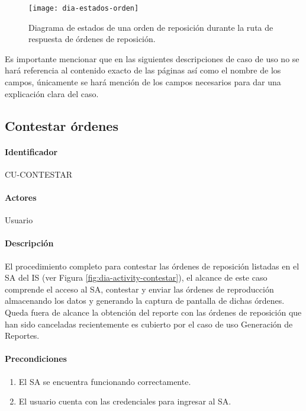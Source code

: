 \begin{figure}[h]
  \centering
  \texttt{[image: dia-estados-orden]} 
  \caption{Diagrama de estados de una orden de reposición durante la ruta de respuesta de órdenes de reposición.}
  \label{fig:dia-estados-orden}
\end{figure}

Es importante mencionar que en las siguientes descripciones de caso de uso no se hará referencia al contenido exacto de las páginas así como el nombre de los campos, únicamente se hará mención de los campos necesarios para dar una explicación clara del caso.

\subsection{Contestar órdenes}\label{cu-contestar}
\paragraph{Identificador}
CU-CONTESTAR
\paragraph{Actores}
Usuario
\paragraph{Descripción}
El procedimiento completo para contestar las órdenes de reposición listadas en el SA del IS (ver Figura \ref{fig:dia-activity-contestar}), el alcance de este caso comprende el acceso al SA, contestar y enviar las órdenes de reproducción almacenando los datos y generando la captura de pantalla de dichas órdenes.\\
Queda fuera de alcance la obtención del reporte con las órdenes de reposición que han sido canceladas recientemente es cubierto por el caso de uso Generación de Reportes.
\paragraph{Precondiciones}
\begin{enumerate}
  \item El SA se encuentra funcionando correctamente.
  \item El usuario cuenta con las credenciales para ingresar al SA.
\end{enumerate}
